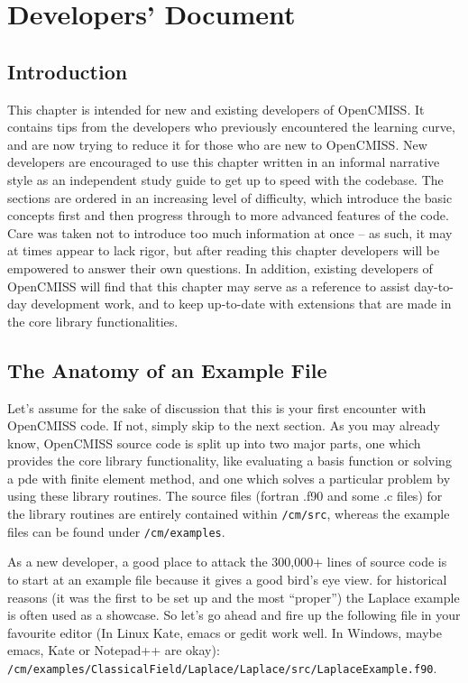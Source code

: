 \raggedbottom
\clearemptydoublepage
\chapter{Developers' Document}
\label{cha:developers}

\section{Introduction}
\label{sec:devel_intro}

This chapter is intended for new and existing developers of OpenCMISS. It contains tips
from the developers who previously encountered the learning curve, and are now trying to 
reduce it for those who are new to OpenCMISS. New developers are encouraged to use this
chapter written in an informal narrative style as an independent study guide to get up to 
speed with the codebase. The sections are ordered in an increasing level of difficulty,
which introduce the basic concepts first and then progress through to more advanced features 
of the code. Care was taken not to introduce too much information at once -- as such, it
may at times appear to lack rigor, but after reading this chapter developers will be 
empowered to answer their own questions. In addition, existing developers of OpenCMISS 
will find that this chapter may serve as a reference to assist day-to-day development work, 
and to keep up-to-date with extensions that are made in the core library functionalities.

\section{The Anatomy of an Example File}

Let's assume for the sake of discussion that this is your first encounter with OpenCMISS
code. If not, simply skip to the next section. As you may already know, OpenCMISS source 
code is split up into two major parts, one which provides the core library functionality, 
like evaluating a basis function or solving a pde with finite element method, and one which 
solves a particular problem by using these library routines. The source files (fortran .f90 
and some .c files) for the library routines are entirely contained within \texttt{/cm/src}, 
whereas the example files can be found under \texttt{/cm/examples}. 

As a new developer, a good place to attack the 300,000+ lines of source code is to start 
at an example file because it gives a good bird's eye view. for historical reasons (it was 
the first to be set up and the most ``proper'') the Laplace example is often used as a 
showcase. So let's go ahead and fire up the following file in your favourite editor (In Linux
Kate, emacs or gedit work well. In Windows, maybe emacs, Kate or Notepad++ are okay):\\
\texttt{/cm/examples/ClassicalField/Laplace/Laplace/src/LaplaceExample.f90}.


